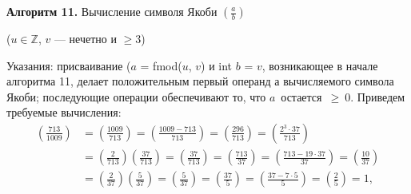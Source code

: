 \documentclass{mai_book}
\begin{document}
\begin{center}
\end{center}
\begin{center}
	\textbf{Алгоритм 11. }Вычисление символя Якоби $(\frac{a}{b})$ \par
	($u \in \mathbb{Z}$, $v$ --- нечетно и $\ge 3$)
\end{center}
Указания: присваивание ($a$ = fmod($u$, $v$) и int $b$ = $v$, возникающее в  начале алгоритма 11, делает положительным первый операнд $а$ вычисляемого символа Якоби; последующие операции обеспечивают то, что $a$~остается~$\ge~0$. Приведем требуемые вычисления: 
\begin{align*}
	\left( \frac{713}{1009} \right) &= \left( \frac{1009}{713} \right) = \left( \frac{1009-713}{713} \right) = \left( \frac{296}{713} \right) = \left( \frac{2^3 \cdot 37}{713} \right) \\
	&= \left( \frac{2}{713} \right) \left( \frac{37}{713} \right) = \left( \frac{37}{713} \right) = \left( \frac{713}{37} \right) = \left( \frac{713 - 19 \cdot 37}{37} \right) = \left( \frac{10}{37} \right) \\
	&= \left( \frac{2}{37} \right) \left( \frac{5}{37} \right) = \left( \frac{5}{37} \right) = \left( \frac{37}{5} \right) = \left( \frac{37 - 7 \cdot 5}{5} \right) = \left( \frac{2}{5} \right) = 1,
\end{align*}
\end{document}

